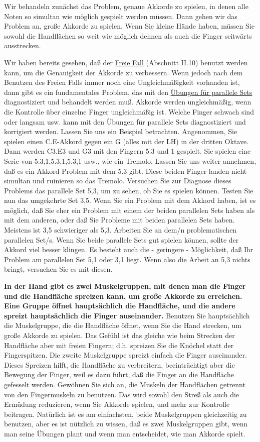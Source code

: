 Wir behandeln zunächst das Problem, genaue Akkorde zu spielen, in denen alle Noten so simultan wie möglich gespielt werden müssen.
Dann gehen wir das Problem an, große Akkorde zu spielen.
Wenn Sie kleine Hände haben, müssen Sie sowohl die Handflächen so weit wie möglich dehnen als auch die Finger seitwärts ausstrecken.

Wir haben bereits gesehen, daß der \hyperlink{c1ii10}{Freie Fall} (Abschnitt II.10) benutzt werden kann, um die Genauigkeit der Akkorde zu verbessern.
Wenn jedoch nach dem Benutzen des Freien Falls immer noch eine Ungleichmäßigkeit vorhanden ist, dann gibt es ein fundamentales Problem, das mit den \hyperlink{c1iii7b}{Übungen für parallele Sets} diagnostiziert und behandelt werden muß.
Akkorde werden ungleichmäßig, wenn die Kontrolle über einzelne Finger ungleichmäßig ist.
Welche Finger schwach sind oder langsam usw. kann mit den Übungen für parallele Sets diagnostiziert und korrigiert werden.
Lassen Sie uns ein Beispiel betrachten.
Angenommen, Sie spielen einen C.E-Akkord gegen ein G (alles mit der LH) in der dritten Oktave.
Dann werden C3.E3 und G3 mit den Fingern 5.3 und 1 gespielt.
Sie spielen eine Serie von 5.3,1,5.3,1,5.3,1 usw., wie ein Tremolo.
Lassen Sie uns weiter annehmen, daß es ein Akkord-Problem mit dem 5.3 gibt.
Diese beiden Finger landen nicht simultan und ruinieren so das Tremolo.
Versuchen Sie zur Diagnose dieses Problems das parallele Set 5,3, um zu sehen, ob Sie es spielen können.
Testen Sie nun das umgekehrte Set 3,5.
Wenn Sie ein Problem mit dem Akkord haben, ist es möglich, daß Sie eher ein Problem mit einem der beiden parallelen Sets haben als mit dem anderen, oder daß Sie Probleme mit beiden parallelen Sets haben.
Meistens ist 3,5 schwieriger als 5,3.
Arbeiten Sie an dem/n problematischen parallelen Set/s.
Wenn Sie beide parallele Sets gut spielen können, sollte der Akkord viel besser klingen.
Es besteht auch die - geringere - Möglichkeit, daß Ihr Problem am parallelen Set 5,1 oder 3,1 liegt.
Wenn also die Arbeit an 5,3 nichts bringt, versuchen Sie es mit diesen.

\textbf{In der Hand gibt es zwei Muskelgruppen, mit denen man die Finger und die Handfläche spreizen kann, um große Akkorde zu erreichen.
Eine Gruppe öffnet hauptsächlich die Handfläche, und die andere spreizt hauptsächlich die Finger auseinander.}
Benutzen Sie hauptsächlich die Muskelgruppe, die die Handfläche öffnet, wenn Sie die Hand strecken, um große Akkorde zu spielen.
Das Gefühl ist das gleiche wie beim Strecken der Handfläche aber mit freien Fingern; d.h. spreizen Sie die Knöchel statt der Fingerspitzen.
Die zweite Muskelgruppe spreizt einfach die Finger auseinander.
Dieses Spreizen hilft, die Handfläche zu verbreitern, beeinträchtigt aber die Bewegung der Finger, weil es dazu führt, daß die Finger an die Handfläche gefesselt werden.
Gewöhnen Sie sich an, die Muskeln der Handflächen getrennt von den Fingermuskeln zu benutzen.
Das wird sowohl den Streß als auch die Ermüdung reduzieren, wenn Sie Akkorde spielen, und mehr zur Kontrolle beitragen.
Natürlich ist es am einfachsten, beide Muskelgruppen gleichzeitig zu benutzen, aber es ist nützlich zu wissen, daß es zwei Muskelgruppen gibt, wenn man seine Übungen plant und wenn man entscheidet, wie man Akkorde spielt.


